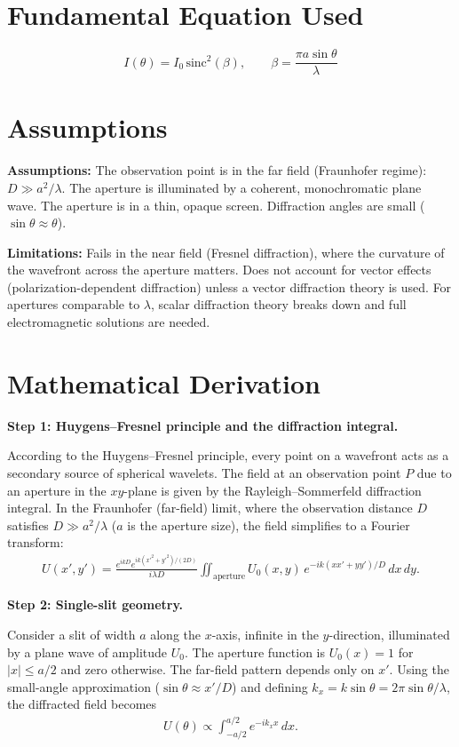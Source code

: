 \documentclass[11pt,openright]{book}
\begin{document}
\section*{Fundamental Equation Used}

\[
I(\theta) = I_0\,\text{sinc}^2(\beta),\qquad \beta = \frac{\pi a \sin\theta}{\lambda}
\]
\section*{Assumptions}

\textbf{Assumptions:} The observation point is in the far field (Fraunhofer regime): $D \gg a^2/\lambda$. The aperture is illuminated by a coherent, monochromatic plane wave. The aperture is in a thin, opaque screen. Diffraction angles are small ($\sin\theta \approx \theta$).


\textbf{Limitations:} Fails in the near field (Fresnel diffraction), where the curvature of the wavefront across the aperture matters. Does not account for vector effects (polarization-dependent diffraction) unless a vector diffraction theory is used. For apertures comparable to $\lambda$, scalar diffraction theory breaks down and full electromagnetic solutions are needed.


\section*{Mathematical Derivation}

\textbf{Step 1: Huygens--Fresnel principle and the diffraction integral.}

According to the Huygens--Fresnel principle, every point on a wavefront acts as a secondary source of spherical wavelets. The field at an observation point $P$ due to an aperture in the $xy$-plane is given by the Rayleigh--Sommerfeld diffraction integral. In the Fraunhofer (far-field) limit, where the observation distance $D$ satisfies $D \gg a^2/\lambda$ ($a$ is the aperture size), the field simplifies to a Fourier transform:
\begin{align}
U(x', y') = \frac{e^{ikD}e^{ik(x'^2+y'^2)/(2D)}}{i\lambda D}\iint_{\text{aperture}} U_0(x,y)\,e^{-ik(xx'+yy')/D}\,dx\,dy.
\end{align}

\textbf{Step 2: Single-slit geometry.}

Consider a slit of width $a$ along the $x$-axis, infinite in the $y$-direction, illuminated by a plane wave of amplitude $U_0$. The aperture function is $U_0(x) = 1$ for $|x| \leq a/2$ and zero otherwise. The far-field pattern depends only on $x'$. Using the small-angle approximation ($\sin\theta \approx x'/D$) and defining $k_x = k\sin\theta = 2\pi\sin\theta/\lambda$, the diffracted field becomes
\begin{align}
U(\theta) \propto \int_{-a/2}^{a/2} e^{-ik_x x}\,dx.
\end{align}
\end{document}
